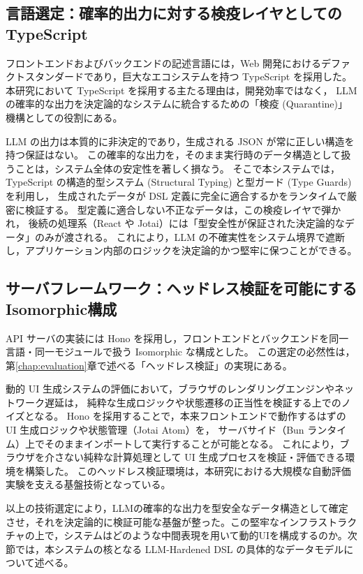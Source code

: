 \documentclass[senior,final,11pt,dvipdfmx]{iputit-thesis}
\begin{document}
\subsection{言語選定：確率的出力に対する検疫レイヤとしてのTypeScript}

フロントエンドおよびバックエンドの記述言語には，Web 開発におけるデファクトスタンダードであり，巨大なエコシステムを持つ TypeScript \cite{stackoverflow2024} を採用した。
本研究において TypeScript を採用する主たる理由は，開発効率ではなく，
LLM の確率的な出力を決定論的なシステムに統合するための「検疫 (Quarantine)」機構としての役割にある。

LLM の出力は本質的に非決定的であり，生成される JSON が常に正しい構造を持つ保証はない。
この確率的な出力を，そのまま実行時のデータ構造として扱うことは，システム全体の安定性を著しく損なう。
そこで本システムでは，TypeScript の構造的型システム (Structural Typing) と型ガード (Type Guards) を利用し，
生成されたデータが DSL 定義に完全に適合するかをランタイムで厳密に検証する。
型定義に適合しない不正なデータは，この検疫レイヤで弾かれ，
後続の処理系（React や Jotai）には「型安全性が保証された決定論的なデータ」のみが渡される。
これにより，LLM の不確実性をシステム境界で遮断し，アプリケーション内部のロジックを決定論的かつ堅牢に保つことができる。

\subsection{サーバフレームワーク：ヘッドレス検証を可能にするIsomorphic構成}

API サーバの実装には Hono を採用し，フロントエンドとバックエンドを同一言語・同一モジュールで扱う Isomorphic な構成とした。
この選定の必然性は，第\ref{chap:evaluation}章で述べる「ヘッドレス検証」の実現にある。

動的 UI 生成システムの評価において，ブラウザのレンダリングエンジンやネットワーク遅延は，
純粋な生成ロジックや状態遷移の正当性を検証する上でのノイズとなる。
Hono を採用することで，本来フロントエンドで動作するはずの UI 生成ロジックや状態管理（Jotai Atom）を，
サーバサイド（Bun ランタイム）上でそのままインポートして実行することが可能となる。
これにより，ブラウザを介さない純粋な計算処理として UI 生成プロセスを検証・評価できる環境を構築した。
このヘッドレス検証環境は，本研究における大規模な自動評価実験を支える基盤技術となっている。

以上の技術選定により，LLMの確率的な出力を型安全なデータ構造として確定させ，それを決定論的に検証可能な基盤が整った。この堅牢なインフラストラクチャの上で，システムはどのような中間表現を用いて動的UIを構成するのか。次節では，本システムの核となる LLM-Hardened DSL の具体的なデータモデルについて述べる。
\end{document}
